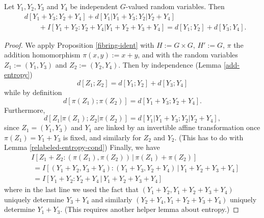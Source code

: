 \begin{corollary}\label{cor-fibre}
  \leanok
  Let $Y_1,Y_2,Y_3$ and $Y_4$ be independent $G$-valued random variables.
  Then
\begin{align*}
  & d[Y_1+Y_3; Y_2+Y_4] + d[Y_1|Y_1+Y_3; Y_2|Y_2+Y_4] \\
  &\qquad + I[ Y_1+Y_2 : Y_2 + Y_4 | Y_1+Y_2+Y_3+Y_4 ] = d[Y_1; Y_2] + d[ Y_3; Y_4].
\end{align*}
\end{corollary}

\begin{proof}
  We apply Proposition \ref{fibring-ident} with $H := G \times G$, $H' := G$, $\pi$ the addition homomorphism $\pi(x,y) := x+y$, and with the random variables $Z_1 := (Y_1,Y_3)$ and $Z_2 := (Y_2,Y_4)$.  Then by independence (Lemma \ref{add-entropy})
\[
  d[Z_1; Z_2] = d[Y_1; Y_2] + d[Y_3; Y_4]
\]
while by definition
\[
  d[\pi(Z_1); \pi(Z_2)] = d[Y_1+Y_3; Y_2+Y_4].
\]
Furthermore,
\[
  d[Z_1|\pi(Z_1); Z_2|\pi(Z_2)] = d[Y_1|Y_1+Y_3;Y_2|Y_2+Y_4],
\]
since $Z_1=(Y_1,Y_3)$ and $Y_1$ are linked by an invertible affine transformation once $\pi(Z_1)=Y_1+Y_3$ is fixed, and similarly for $Z_2$ and $Y_2$.  (This has to do with Lemma \ref{relabeled-entropy-cond})
Finally, we have
\begin{align*}
  &I[Z_1 + Z_2 : (\pi(Z_1),\pi(Z_2)) \,|\, \pi(Z_1) + \pi(Z_2)] \\
  &\ = I[(Y_1+Y_2, Y_3+Y_4) : (Y_1+Y_3, Y_2+Y_4) \,|\, Y_1+Y_2+Y_3+Y_4] \\
  &\ = I[Y_1+Y_2 : Y_2+Y_4 \,|\, Y_1+Y_2+Y_3+Y_4]
\end{align*}
where in the last line we used the fact that $(Y_1+Y_2, Y_1+Y_2+Y_3+Y_4)$ uniquely determine $Y_3+Y_4$ and similarly
$(Y_2+Y_4, Y_1+Y_2+Y_3+Y_4)$ uniquely determine $Y_1+Y_3$.  (This requires another helper lemma about entropy.)
\end{proof}
